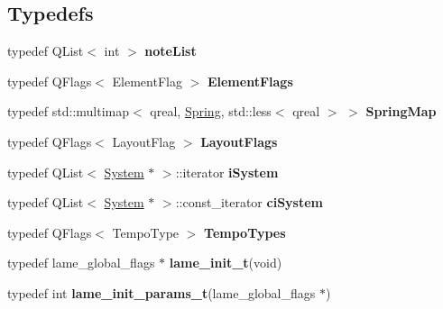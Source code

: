 \subsection*{Typedefs}
\begin{DoxyCompactItemize}
\item 
\mbox{\label{namespace_ms_ac4b1c8b6b879ff6de5e831eb1f0fa88b}} 
typedef Q\+List$<$ int $>$ {\bfseries note\+List}
\item 
\mbox{\label{namespace_ms_aeb0ceaa4a6e1f7555b171dd8f597c2d6}} 
typedef Q\+Flags$<$ Element\+Flag $>$ {\bfseries Element\+Flags}
\item 
\mbox{\label{namespace_ms_a365dcf81941d576fcd006011e32185c5}} 
typedef std\+::multimap$<$ qreal, \hyperlink{struct_ms_1_1_spring}{Spring}, std\+::less$<$ qreal $>$ $>$ {\bfseries Spring\+Map}
\item 
\mbox{\label{namespace_ms_ac9cc585124cee1b040130fc25af56dac}} 
typedef Q\+Flags$<$ Layout\+Flag $>$ {\bfseries Layout\+Flags}
\item 
\mbox{\label{namespace_ms_a63384c9a401e15b7e12a507026b4513b}} 
typedef Q\+List$<$ \hyperlink{class_ms_1_1_system}{System} $\ast$ $>$\+::iterator {\bfseries i\+System}
\item 
\mbox{\label{namespace_ms_a3adcac1feac1cf5282d9b1c53d61ce85}} 
typedef Q\+List$<$ \hyperlink{class_ms_1_1_system}{System} $\ast$ $>$\+::const\+\_\+iterator {\bfseries ci\+System}
\item 
\mbox{\label{namespace_ms_a574c55e548133058afdec8b5b872ac21}} 
typedef Q\+Flags$<$ Tempo\+Type $>$ {\bfseries Tempo\+Types}
\item 
\mbox{\label{namespace_ms_a027201092034851bc42786dfc818bbc2}} 
typedef lame\+\_\+global\+\_\+flags $\ast$ {\bfseries lame\+\_\+init\+\_\+t}(void)
\item 
\mbox{\label{namespace_ms_a0bfd726c380c2d529cd97aa05663ee7d}} 
typedef int {\bfseries lame\+\_\+init\+\_\+params\+\_\+t}(lame\+\_\+global\+\_\+flags $\ast$)
\item 
\mbox{\label{namespace_ms_acb3eeae63a6e83f4c2d1f7eb89d0d6c7}} 

\end{DoxyCompactItemize}
